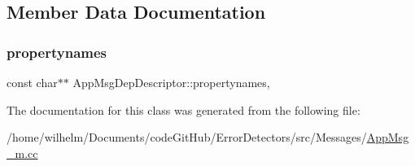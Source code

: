 \subsection{Member Data Documentation}
\mbox{\label{class_app_msg_dep_descriptor_a03578bf1418ef896a9abfcded857b728}} 
\subsubsection{\texorpdfstring{propertynames}{propertynames}}
{\footnotesize\ttfamily const char$\ast$$\ast$ App\+Msg\+Dep\+Descriptor\+::propertynames\hspace{0.3cm}{\ttfamily [mutable]}, {\ttfamily [private]}}



The documentation for this class was generated from the following file\+:\begin{DoxyCompactItemize}
\item 
/home/wilhelm/\+Documents/code\+Git\+Hub/\+Error\+Detectors/src/\+Messages/\hyperlink{_app_msg__m_8cc}{App\+Msg\+\_\+m.\+cc}\end{DoxyCompactItemize}

